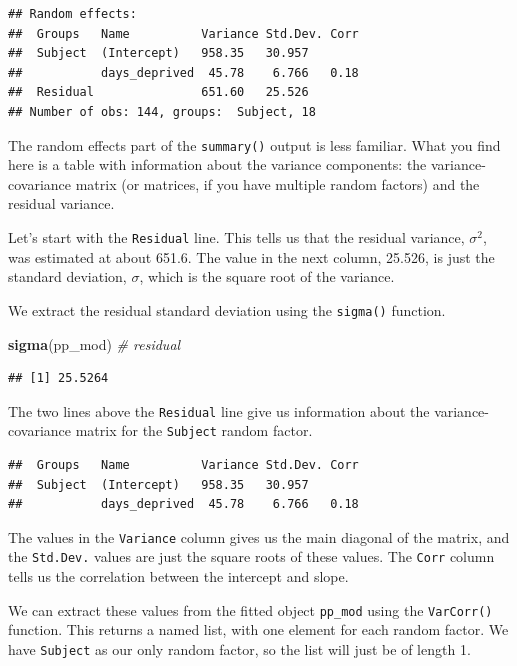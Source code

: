 \documentclass[]{book}
\newenvironment{Shaded}{\begin{snugshade}}{\end{snugshade}}
\newcommand{\CommentTok}[1]{\textcolor[rgb]{0.56,0.35,0.01}{\textit{#1}}}
\newcommand{\KeywordTok}[1]{\textcolor[rgb]{0.13,0.29,0.53}{\textbf{#1}}}
\newcommand{\NormalTok}[1]{#1}
\begin{document}
\begin{verbatim}
## Random effects:
##  Groups   Name          Variance Std.Dev. Corr
##  Subject  (Intercept)   958.35   30.957       
##           days_deprived  45.78    6.766   0.18
##  Residual               651.60   25.526       
## Number of obs: 144, groups:  Subject, 18
\end{verbatim}

The random effects part of the \texttt{summary()} output is less familiar. What you find here is a table with information about the variance components: the variance-covariance matrix (or matrices, if you have multiple random factors) and the residual variance.

Let's start with the \texttt{Residual} line. This tells us that the residual variance, \(\sigma^2\), was estimated at about
651.6. The value in the next column,
25.526, is just the standard deviation, \(\sigma\), which is the square root of the variance.

We extract the residual standard deviation using the \texttt{sigma()} function.

\begin{Shaded}
\begin{Highlighting}[]
\KeywordTok{sigma}\NormalTok{(pp_mod) }\CommentTok{# residual}
\end{Highlighting}
\end{Shaded}

\begin{verbatim}
## [1] 25.5264
\end{verbatim}

The two lines above the \texttt{Residual} line give us information about the variance-covariance matrix for the \texttt{Subject} random factor.

\begin{verbatim}
##  Groups   Name          Variance Std.Dev. Corr
##  Subject  (Intercept)   958.35   30.957       
##           days_deprived  45.78    6.766   0.18
\end{verbatim}

The values in the \texttt{Variance} column gives us the main diagonal of the matrix, and the \texttt{Std.Dev.} values are just the square roots of these values. The \texttt{Corr} column tells us the correlation between the intercept and slope.

We can extract these values from the fitted object \texttt{pp\_mod} using the \texttt{VarCorr()} function. This returns a named list, with one element for each random factor. We have \texttt{Subject} as our only random factor, so the list will just be of length 1.
\end{document}

